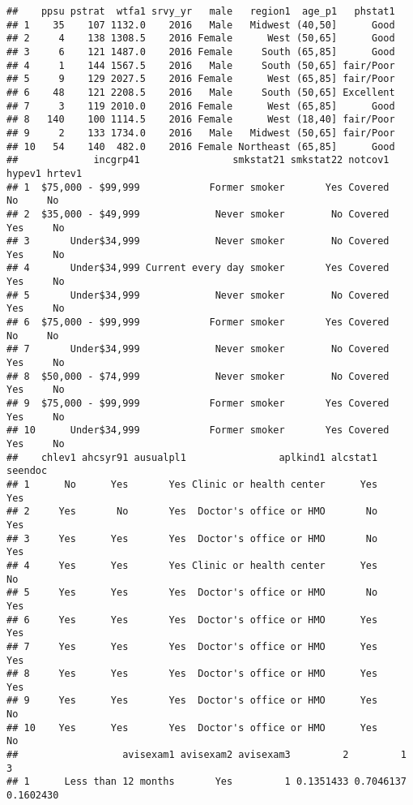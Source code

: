 \documentclass[]{article}
\begin{document}
\begin{verbatim}
##    ppsu pstrat  wtfa1 srvy_yr   male   region1  age_p1   phstat1
## 1    35    107 1132.0    2016   Male   Midwest (40,50]      Good
## 2     4    138 1308.5    2016 Female      West (50,65]      Good
## 3     6    121 1487.0    2016 Female     South (65,85]      Good
## 4     1    144 1567.5    2016   Male     South (50,65] fair/Poor
## 5     9    129 2027.5    2016 Female      West (65,85] fair/Poor
## 6    48    121 2208.5    2016   Male     South (50,65] Excellent
## 7     3    119 2010.0    2016 Female      West (65,85]      Good
## 8   140    100 1114.5    2016 Female      West (18,40] fair/Poor
## 9     2    133 1734.0    2016   Male   Midwest (50,65] fair/Poor
## 10   54    140  482.0    2016 Female Northeast (65,85]      Good
##             incgrp41                smkstat21 smkstat22 notcov1 hypev1 hrtev1
## 1  $75,000 - $99,999            Former smoker       Yes Covered     No     No
## 2  $35,000 - $49,999             Never smoker        No Covered    Yes     No
## 3       Under$34,999             Never smoker        No Covered    Yes     No
## 4       Under$34,999 Current every day smoker       Yes Covered    Yes     No
## 5       Under$34,999             Never smoker        No Covered    Yes     No
## 6  $75,000 - $99,999            Former smoker       Yes Covered     No     No
## 7       Under$34,999             Never smoker        No Covered    Yes     No
## 8  $50,000 - $74,999             Never smoker        No Covered    Yes     No
## 9  $75,000 - $99,999            Former smoker       Yes Covered    Yes     No
## 10      Under$34,999            Former smoker       Yes Covered    Yes     No
##    chlev1 ahcsyr91 ausualpl1                aplkind1 alcstat1 seendoc
## 1      No      Yes       Yes Clinic or health center      Yes     Yes
## 2     Yes       No       Yes  Doctor's office or HMO       No     Yes
## 3     Yes      Yes       Yes  Doctor's office or HMO       No     Yes
## 4     Yes      Yes       Yes Clinic or health center      Yes      No
## 5     Yes      Yes       Yes  Doctor's office or HMO       No     Yes
## 6     Yes      Yes       Yes  Doctor's office or HMO      Yes     Yes
## 7     Yes      Yes       Yes  Doctor's office or HMO      Yes     Yes
## 8     Yes      Yes       Yes  Doctor's office or HMO      Yes     Yes
## 9     Yes      Yes       Yes  Doctor's office or HMO      Yes      No
## 10    Yes      Yes       Yes  Doctor's office or HMO      Yes      No
##                  avisexam1 avisexam2 avisexam3         2         1         3
## 1      Less than 12 months       Yes         1 0.1351433 0.7046137 0.1602430

\end{verbatim}
\end{document}
